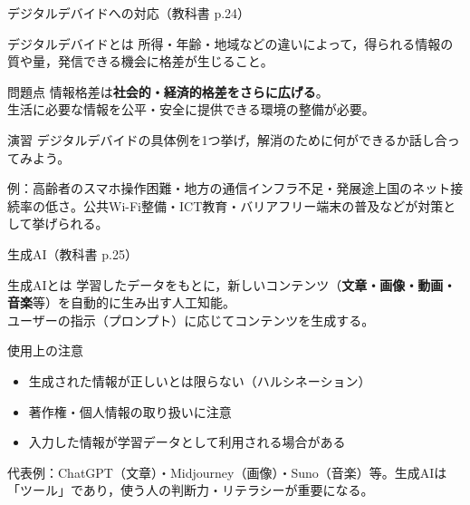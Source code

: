 \documentclass[aspectratio=43,professionalfonts,handout,10pt]{beamer}
\begin{document}
\begin{frame}{デジタルデバイドへの対応（教科書 p.24）}
  \begin{block}{デジタルデバイドとは}
    所得・年齢・地域などの違いによって，得られる情報の質や量，発信できる機会に格差が生じること。
  \end{block}

  \vfill

  \begin{alertblock}{問題点}
    情報格差は\textbf{社会的・経済的格差をさらに広げる}。\\
    生活に必要な情報を公平・安全に提供できる環境の整備が必要。
  \end{alertblock}

  \begin{exampleblock}{演習}
    デジタルデバイドの具体例を1つ挙げ，解消のために何ができるか話し合ってみよう。
  \end{exampleblock}

  \begin{slidenote}
    例：高齢者のスマホ操作困難・地方の通信インフラ不足・発展途上国のネット接続率の低さ。公共Wi-Fi整備・ICT教育・バリアフリー端末の普及などが対策として挙げられる。
  \end{slidenote}
\end{frame}


\begin{frame}{生成AI（教科書 p.25）}
  \begin{block}{生成AIとは}
    \small
    学習したデータをもとに，新しいコンテンツ（\textbf{文章・画像・動画・音楽}等）を自動的に生み出す人工知能。\\
    ユーザーの指示（プロンプト）に応じてコンテンツを生成する。
  \end{block}

  \vfill

  \begin{alertblock}{使用上の注意}
    \small
    \begin{itemize}
      \item 生成された情報が正しいとは限らない（ハルシネーション）
      \item 著作権・個人情報の取り扱いに注意
      \item 入力した情報が学習データとして利用される場合がある
    \end{itemize}
  \end{alertblock}

  \begin{slidenote}
    代表例：ChatGPT（文章）・Midjourney（画像）・Suno（音楽）等。生成AIは「ツール」であり，使う人の判断力・リテラシーが重要になる。
  \end{slidenote}
\end{frame}
\end{document}
